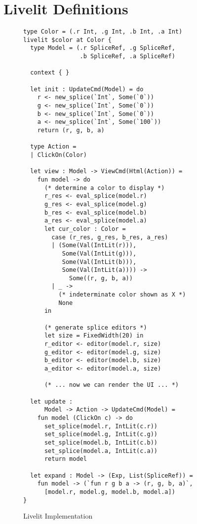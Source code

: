 \section{Livelit Definitions}\label{sec:livelit-definitions}

\begin{figure}
\begin{lstlisting}[xleftmargin=0.2cm]
type Color = (.r Int, .g Int, .b Int, .a Int)
livelit $color at Color {
  type Model = (.r SpliceRef, .g SpliceRef, 
                .b SpliceRef, .a SpliceRef)

  context { }

  let init : UpdateCmd(Model) = do 
    r <- new_splice(`Int`, Some(`0`))
    g <- new_splice(`Int`, Some(`0`))
    b <- new_splice(`Int`, Some(`0`))
    a <- new_splice(`Int`, Some(`100`))
    return (r, g, b, a)

  type Action = 
  | ClickOn(Color)

  let view : Model -> ViewCmd(Html(Action)) = 
    fun model -> do 
      (* determine a color to display *)
      r_res <- eval_splice(model.r)
      g_res <- eval_splice(model.g)
      b_res <- eval_splice(model.b)
      a_res <- eval_splice(model.a)
      let cur_color : Color = 
        case (r_res, g_res, b_res, a_res) 
        | (Some(Val(IntLit(r))), 
           Some(Val(IntLit(g))), 
           Some(Val(IntLit(b))), 
           Some(Val(IntLit(a)))) -> 
             Some((r, g, b, a))
        | _ -> 
          (* indeterminate color shown as X *)
          None 
      in 
      
      (* generate splice editors *)
      let size = FixedWidth(20) in 
      r_editor <- editor(model.r, size)
      g_editor <- editor(model.g, size)
      b_editor <- editor(model.b, size)
      a_editor <- editor(model.a, size)
      
      (* ... now we can render the UI ... *)
    
  let update : 
      Model -> Action -> UpdateCmd(Model) =
    fun model (ClickOn c) -> do 
      set_splice(model.r, IntLit(c.r))
      set_splice(model.g, IntLit(c.g))
      set_splice(model.b, IntLit(c.b))
      set_splice(model.a, IntLit(c.a))
      return model
  
  let expand : Model -> (Exp, List(SpliceRef)) = 
    fun model -> (`fun r g b a -> (r, g, b, a)`, 
      [model.r, model.g, model.b, model.a])
}
\end{lstlisting}
\vspace{-8px}
\caption{Livelit Implementation}
\label{fig:color-impl}
\end{figure}

